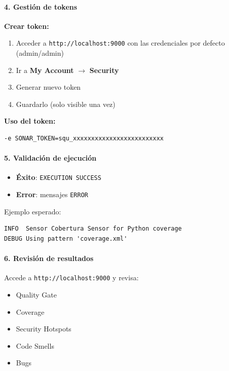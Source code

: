 \paragraph*{4. Gestión de tokens}

\textbf{Crear token:}

\begin{enumerate}
    \item Acceder a \texttt{http://localhost:9000} con las credenciales por defecto (admin/admin)
    \item Ir a \textbf{My Account} $\rightarrow$ \textbf{Security}
    \item Generar nuevo token
    \item Guardarlo (solo visible una vez)
\end{enumerate}

\textbf{Uso del token:}

\begin{verbatim}
-e SONAR_TOKEN=squ_xxxxxxxxxxxxxxxxxxxxxxxxx
\end{verbatim}

\paragraph*{5. Validación de ejecución}

\begin{itemize}
    \item \textbf{Éxito}: \texttt{EXECUTION SUCCESS}
    \item \textbf{Error}: mensajes \texttt{ERROR}
\end{itemize}

Ejemplo esperado:

\begin{verbatim}
INFO  Sensor Cobertura Sensor for Python coverage
DEBUG Using pattern 'coverage.xml'
\end{verbatim}

\paragraph*{6. Revisión de resultados}

Accede a \texttt{http://localhost:9000} y revisa:

\begin{itemize}
    \item Quality Gate
    \item Coverage
    \item Security Hotspots
    \item Code Smells
    \item Bugs
\end{itemize}
